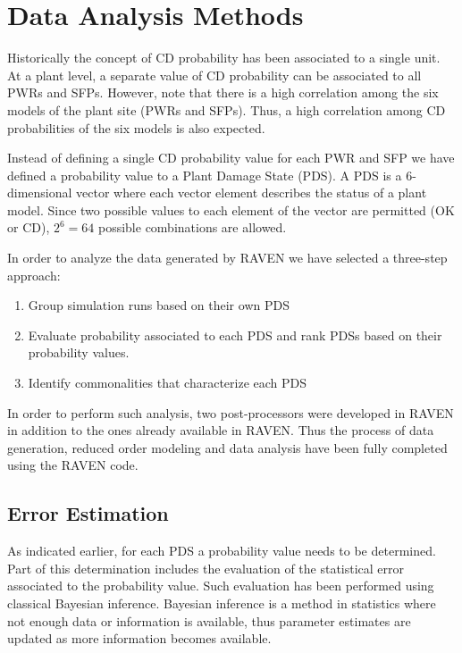 \section{Data Analysis Methods}
\label{sec:plantAnalysisResults}

Historically the concept of CD probability has been  
associated to a single unit. At a plant level, a separate value of CD 
probability can be associated to all PWRs and SFPs. However, note that there 
is a high correlation among the six models of the plant site (PWRs and SFPs). 
Thus, a high correlation among CD probabilities of the six models is also expected.

Instead of defining a single CD probability value for each PWR and SFP 
we have defined a probability value to a Plant Damage State (PDS). 
A PDS is a $6$-dimensional vector where each vector element describes the 
status of a plant model. Since two possible 
values to each element of the vector are permitted (OK or CD), $2^6=64$ possible 
combinations are allowed.

In order to analyze the data generated by RAVEN we have selected a three-step 
approach:
\begin{enumerate}
  \item Group simulation runs based on their own PDS  
  \item Evaluate probability associated to each PDS and rank PDSs based on 
        their probability values.
  \item Identify commonalities that characterize each PDS
\end{enumerate}

In order to perform such analysis, two post-processors were developed in RAVEN in 
addition to the ones already available in RAVEN.
Thus the process of data generation, reduced order modeling and data analysis 
have been fully completed using the RAVEN code.

\subsection{Error Estimation}
As indicated earlier, for each PDS a probability value needs to be 
determined. Part of this determination includes the evaluation of the statistical error
associated to the probability value. Such evaluation has been performed using classical
Bayesian inference.
Bayesian inference is a method in statistics where not enough data or information is 
available, thus parameter estimates are updated as more information becomes available. 

